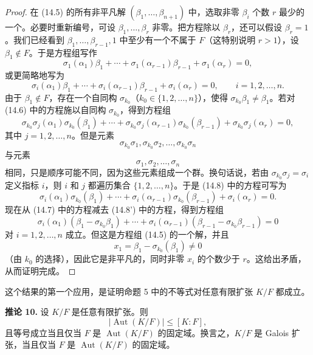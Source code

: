 \begin{proof}
在 (14.5) 的所有非平凡解 $(\beta_1,
\ldots,
\beta_{n+1})$ 中，选取非零 $\beta_i$ 个数 $r$ 最少的一个。必要时重新编号，可设 $\beta_1,
\ldots,
\beta_r$ 非零。把方程除以 $\beta_r$，还可以假设 $\beta_r=1$。我们已经看到 $\beta_1,
\ldots,
\beta_{r-1},1$ 中至少有一个不属于 $F$（这特别说明 $r>1$），设 $\beta_1\notin F$。于是方程组写作
\begin{equation}
\sigma_1(\alpha_1)\beta_1+\cdots+\sigma_1(\alpha_{r-1})\beta_{r-1}+\sigma_1(\alpha_r)=0,
\tag{14.6}
\end{equation}
或更简略地写为
\begin{equation}
\sigma_i(\alpha_1)\beta_1+\cdots+\sigma_i(\alpha_{r-1})\beta_{r-1}+\sigma_i(\alpha_r)=0,
\qquad i=1,2,\ldots,n.
\tag{14.7}
\end{equation}
由于 $\beta_1\notin F$，存在一个自同构 $\sigma_{k_0}$（$k_0\in\{1,2,
\ldots,n\}$），使得 $\sigma_{k_0}\beta_1\neq\beta_1$。若对 (14.6) 中的方程施以自同构 $\sigma_{k_0}$，得到方程组
\begin{equation}
\sigma_{k_0}\sigma_j(\alpha_1)\sigma_{k_0}(\beta_1)+\cdots+
\sigma_{k_0}\sigma_j(\alpha_{r-1})\sigma_{k_0}(\beta_{r-1})+
\sigma_{k_0}\sigma_j(\alpha_r)=0,
\tag{14.8}
\end{equation}
其中 $j=1,2,
\ldots,n$。但是元素
\[
\sigma_{k_0}\sigma_1,
\sigma_{k_0}\sigma_2,
\ldots,
\sigma_{k_0}\sigma_n
\]
与元素
\[
\sigma_1,
\sigma_2,
\ldots,
\sigma_n
\]
相同，只是顺序可能不同，因为这些元素组成一个群。换句话说，若由 $\sigma_{k_0}\sigma_j=\sigma_i$ 定义指标 $i$，则 $i$ 和 $j$ 都遍历集合 $\{1,2,
\ldots,n\}$。于是 (14.8) 中的方程可写为
\begin{equation}
\sigma_i(\alpha_1)\sigma_{k_0}(\beta_1)+\cdots+
\sigma_i(\alpha_{r-1})\sigma_{k_0}(\beta_{r-1})+
\sigma_i(\alpha_r)=0.
\tag{14.8'}
\end{equation}
现在从 (14.7) 中的方程减去 (14.8') 中的方程，得到方程组
\[
\sigma_i(\alpha_1)(\beta_1-\sigma_{k_0}\beta_1)+\cdots+
\sigma_i(\alpha_{r-1})(\beta_{r-1}-\sigma_{k_0}\beta_{r-1})=0
\]
对 $i=1,2,
\ldots,n$ 成立。但这是方程组 (14.5) 的一个解，并且
\[
 x_1=\beta_1-\sigma_{k_0}(\beta_1)\neq0
\]
（由 $k_0$ 的选择），因此它是非平凡的，同时非零 $x_i$ 的个数少于 $r$。这给出矛盾，从而证明完成。
\end{proof}

这个结果的第一个应用，是证明命题 5 中的不等式对任意有限扩张 $K/F$ 都成立。

\noindent\textbf{推论 10.} 设 $K/F$ 是任意有限扩张。则
\[
|\operatorname{Aut}(K/F)|\leq [K:F],
\]
且等号成立当且仅当 $F$ 是 $\operatorname{Aut}(K/F)$ 的固定域。换言之，$K/F$ 是 Galois 扩张，当且仅当 $F$ 是 $\operatorname{Aut}(K/F)$ 的固定域。

